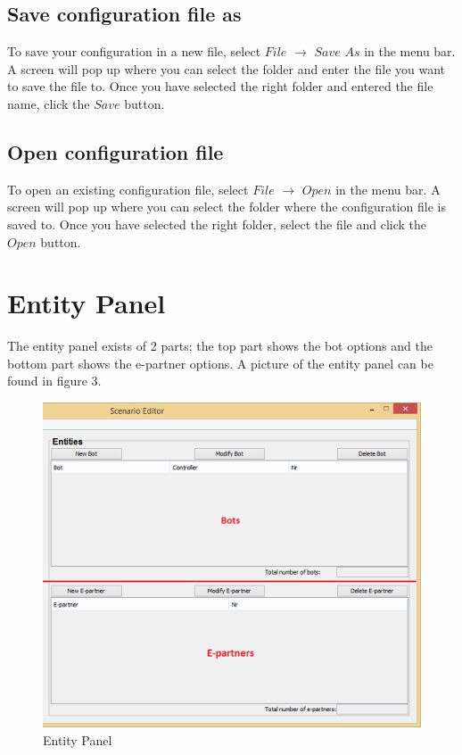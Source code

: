 \documentclass[a4paper]{article}
\begin{document}
\subsection{Save configuration file as}
To save your configuration in a new file, select $File$ $\to$ $Save$ $As$ in the menu bar. A screen will pop up where you can select the folder and enter the file you want to save the file to. Once you have selected the right folder and entered the file name, click the $Save$ button.

\subsection{Open configuration file}
To open an existing configuration file, select $File$ $\to$ $Open$ in the menu bar. A screen will pop up where you can select the folder where the configuration file is saved to. Once you have selected the right folder, select the file and click the $Open$ button.

\section{Entity Panel}
The entity panel exists of 2 parts; the top part shows the bot options and the bottom part shows the e-partner options. A picture of the entity panel can be found in figure 3.
\begin{figure}[h]
\begin{center}
\includegraphics{bot.png}
\end{center}
\caption{Entity Panel}
\end{figure}
\end{document}
